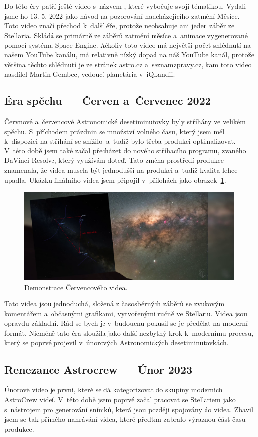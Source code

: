 \documentclass[12pt,a4paper,titlepage]{article}
\begin{document}
Do této éry patří ještě video s~názvem , které vybočuje svojí tématikou. Vydali jsme ho 13. 5. 2022 jako návod na pozorování nadcházejícího zatmění Měsíce. Toto video značí přechod k~další éře, protože neobsahuje ani jeden záběr ze Stellaria. Skládá se primárně ze záběrů zatmění měsíce a~animace vygenerované pomocí systému Space Engine. Ačkoliv toto video má největší počet shlédnutí na našem YouTube kanálu, má relativně nízký dopad na náš YouTube kanál, protože většina těchto shlédnutí je ze stránek astro.cz a~seznamzpravy.cz, kam toto video nasdílel Martin Gembec, vedoucí planetária v~iQLandii.
\subsection{Éra spěchu --- Červen a~Červenec 2022}
Červnové a~červencové Astronomické desetiminutovky byly stříhány ve velikém spěchu. S~příchodem prázdnin se množství volného času, který jsem měl k~dispozici na stříhání se snížilo, a~tudíž bylo třeba produkci optimalizovat. V~této době jsem také začal přecházet do nového stříhacího programu, zvaného DaVinci Resolve, který využívám doteď. Tato změna prostředí produkce znamenala, že videa musela být jednodušší na produkci a~tudíž kvalita lehce upadla. Ukázku finálního videa jsem připojil v~přílohách jako obrázek~\ref{img:cervenec}.

\begin{figure}[ht]
	\centering
	\includegraphics[width=.85\textwidth]{cervenec.png}
	\caption{Demonstrace Červencového videa.}\label{img:cervenec}
\end{figure}

Tato videa jsou jednoduchá, složená z časosběrných záběrů se zvukovým komentářem a~občasnými grafikami, vytvořenými ručně ve Stellariu. Videa jsou opravdu základní. Rád se bych je v~budoucnu pokusil se je předělat na moderní formát. Nicméně tato éra sloužila jako další nezbytný krok k~modernímu procesu, který se poprvé projevil v~únorových Astronomických desetiminutovkách.
\subsection{Renezance Astrocrew --- Únor 2023}
Únorové video je první, které se dá kategorizovat do skupiny moderních AstroCrew videí. V~této době jsem poprvé začal pracovat se Stellariem jako s~nástrojem pro generování snímků, která jsou později spojovány do videa. Zbavil jsem se tak přímého nahrávání videa, které předtím zabralo výraznou část času produkce.
\end{document}
